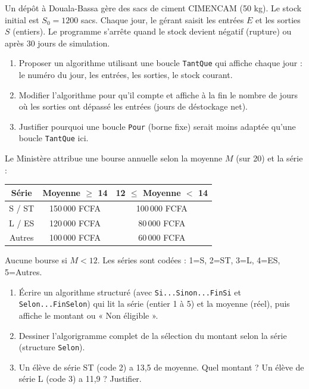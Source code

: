 \documentclass[11pt]{article}
\begin{document}
\begin{exercice}
Un dépôt à Douala-Bassa gère des sacs de ciment CIMENCAM (50 kg). Le stock initial est $S_0 = 1200$ sacs. Chaque jour, le gérant saisit les entrées $E$ et les sorties $S$ (entiers). Le programme s'arrête quand le stock devient négatif (rupture) ou après 30 jours de simulation.
\begin{enumerate}
    \item Proposer un algorithme utilisant une boucle \texttt{TantQue} qui affiche chaque jour : le numéro du jour, les entrées, les sorties, le stock courant.
    \item Modifier l'algorithme pour qu'il compte et affiche à la fin le nombre de jours où les sorties ont dépassé les entrées (jours de déstockage net).
    \item Justifier pourquoi une boucle \texttt{Pour} (borne fixe) serait moins adaptée qu'une boucle \texttt{TantQue} ici.
\end{enumerate}
\end{exercice}

\begin{exercice}
Le Ministère attribue une bourse annuelle selon la moyenne $M$ (sur 20) et la série :
\begin{center}
\begin{tabular}{|c|c|c|}
\hline
\textbf{Série} & \textbf{Moyenne $\ge$ 14} & \textbf{12 $\le$ Moyenne $<$ 14} \\
\hline
S / ST & 150\,000 FCFA & 100\,000 FCFA \\
\hline
L / ES & 120\,000 FCFA & 80\,000 FCFA \\
\hline
Autres & 100\,000 FCFA & 60\,000 FCFA \\
\hline
\end{tabular}
\end{center}
Aucune bourse si $M < 12$. Les séries sont codées : 1=S, 2=ST, 3=L, 4=ES, 5=Autres.
\begin{enumerate}
    \item Écrire un algorithme structuré (avec \texttt{Si...Sinon...FinSi} et \texttt{Selon...FinSelon}) qui lit la série (entier 1 à 5) et la moyenne (réel), puis affiche le montant ou « Non éligible ».
    \item Dessiner l'algorigramme complet de la sélection du montant selon la série (structure \texttt{Selon}).
    \item Un élève de série ST (code 2) a 13,5 de moyenne. Quel montant ? Un élève de série L (code 3) a 11,9 ? Justifier.
\end{enumerate}
\end{exercice}
\end{document}
